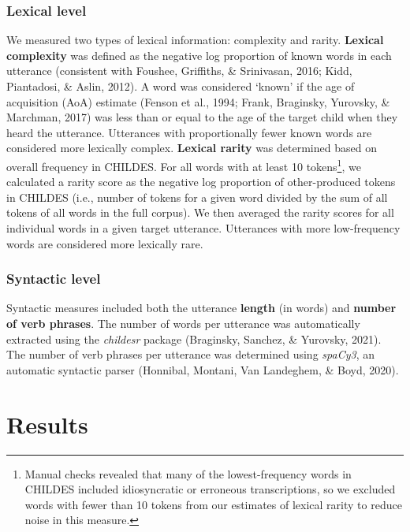 \documentclass[10pt, letterpaper]{article}
\begin{document}
\hypertarget{lexical-level}{%
\subsubsection{Lexical level}\label{lexical-level}}

We measured two types of lexical information: complexity and rarity.
\textbf{Lexical complexity} was defined as the negative log proportion
of known words in each utterance (consistent with Foushee, Griffiths, \&
Srinivasan, 2016; Kidd, Piantadosi, \& Aslin, 2012). A word was
considered `known' if the age of acquisition (AoA) estimate (Fenson et
al., 1994; Frank, Braginsky, Yurovsky, \& Marchman, 2017) was less than
or equal to the age of the target child when they heard the utterance.
Utterances with proportionally fewer known words are considered more
lexically complex. \textbf{Lexical rarity} was determined based on
overall frequency in CHILDES. For all words with at least 10
tokens\footnote{Manual checks revealed that many of the lowest-frequency
  words in CHILDES included idiosyncratic or erroneous transcriptions,
  so we excluded words with fewer than 10 tokens from our estimates of
  lexical rarity to reduce noise in this measure.}, we calculated a
rarity score as the negative log proportion of other-produced tokens in
CHILDES (i.e., number of tokens for a given word divided by the sum of
all tokens of all words in the full corpus). We then averaged the rarity
scores for all individual words in a given target utterance. Utterances
with more low-frequency words are considered more lexically rare.

\hypertarget{syntactic-level}{%
\subsubsection{Syntactic level}\label{syntactic-level}}

Syntactic measures included both the utterance \textbf{length} (in
words) and \textbf{number of verb phrases}. The number of words per
utterance was automatically extracted using the \emph{childesr} package
(Braginsky, Sanchez, \& Yurovsky, 2021). The number of verb phrases per
utterance was determined using \emph{spaCy3}, an automatic syntactic
parser (Honnibal, Montani, Van Landeghem, \& Boyd, 2020).

\hypertarget{results-1}{%
\section{Results}\label{results-1}}
\end{document}
